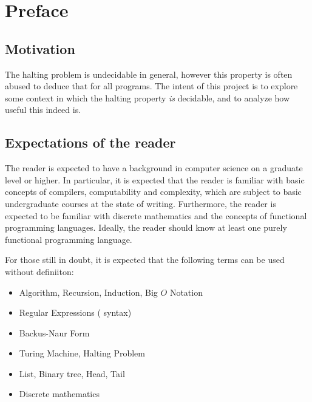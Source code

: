 \chapter{Preface}

\section{Motivation}

The halting problem is undecidable in general, however this property is often
abused to deduce that for all programs. The intent of this project is to
explore some context in which the halting property \emph{is} decidable, and to
analyze how useful this indeed is.

\section{Expectations of the reader}

The reader is expected to have a background in computer science on a graduate
level or higher. In particular, it is expected that the reader is familiar with
basic concepts of compilers, computability and complexity, which are subject to
basic undergraduate courses at the state of writing. Furthermore, the reader is
expected to be familiar with discrete mathematics and the concepts of
functional programming languages. Ideally, the reader should know at least one
purely functional programming language.

For those still in doubt, it is expected that the following terms can be used
without definiiton:

\begin{itemize}

\item Algorithm, Recursion, Induction, Big $O$ Notation

\item Regular Expressions ( syntax)

\item Backus-Naur Form

\item Turing Machine, Halting Problem

\item List, Binary tree, Head, Tail

\item Discrete mathematics

\end{itemize}


